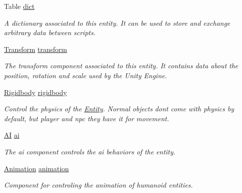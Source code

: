 \begin{DoxyCompactItemize}
\item 
Table \mbox{\hyperlink{class_lua_1_1_entity_ae0c707512eed832f2211ace61d3be75d}{dict}}
\begin{DoxyCompactList}\small\item\em A dictionary associated to this entity. It can be used to store and exchange arbitrary data between scripts. \end{DoxyCompactList}\item 
\mbox{\hyperlink{class_lua_1_1_transform}{Transform}} \mbox{\hyperlink{class_lua_1_1_entity_a51edf8c42bd2acb730ae73d045341320}{transform}}
\begin{DoxyCompactList}\small\item\em The transform component associated to this entity. It contains data about the position, rotation and scale used by the Unity Engine. \end{DoxyCompactList}\item 
\mbox{\hyperlink{class_lua_1_1_rigidbody}{Rigidbody}} \mbox{\hyperlink{class_lua_1_1_entity_a56d48f666679b251eefa10e6f65bbb60}{rigidbody}}
\begin{DoxyCompactList}\small\item\em Control the physics of the \mbox{\hyperlink{class_lua_1_1_entity}{Entity}}. Normal objects don\textquotesingle{}t come with physics by default, but player and npc they have it for movement. \end{DoxyCompactList}\item 
\mbox{\hyperlink{class_lua_1_1_a_i}{AI}} \mbox{\hyperlink{class_lua_1_1_entity_a13c1350817e444010fcbaff8d224039e}{ai}}
\begin{DoxyCompactList}\small\item\em The ai component controls the ai behaviors of the entity. \end{DoxyCompactList}\item 
\mbox{\hyperlink{class_lua_1_1_animation}{Animation}} \mbox{\hyperlink{class_lua_1_1_entity_acf080bfbeeb3a6308c2fdd4cc4993e81}{animation}}
\begin{DoxyCompactList}\small\item\em Component for controling the animation of humanoid entities. \end{DoxyCompactList}\item 

\end{DoxyCompactItemize}
